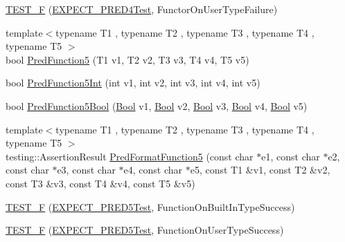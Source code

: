 \begin{DoxyCompactItemize}
\item 
\mbox{\hyperlink{_obj__test_2lib_2googletest-release-1_88_81_2googletest_2test_2gtest__pred__impl__unittest_8cc_a1a34c19097ac1b8c806460f6bbaad59a}{T\+E\+S\+T\+\_\+F}} (\mbox{\hyperlink{googletest-master_2googletest_2test_2gtest__pred__impl__unittest_8cc_abbf7ac63ea663c0dec815df5770cd2a8}{E\+X\+P\+E\+C\+T\+\_\+\+P\+R\+E\+D4\+Test}}, Functor\+On\+User\+Type\+Failure)
\item 
{\footnotesize template$<$typename T1 , typename T2 , typename T3 , typename T4 , typename T5 $>$ }\\bool \mbox{\hyperlink{_obj__test_2lib_2googletest-release-1_88_81_2googletest_2test_2gtest__pred__impl__unittest_8cc_aacb9302c548682f154ddf1a02a23a99f}{Pred\+Function5}} (T1 v1, T2 v2, T3 v3, T4 v4, T5 v5)
\item 
bool \mbox{\hyperlink{_obj__test_2lib_2googletest-release-1_88_81_2googletest_2test_2gtest__pred__impl__unittest_8cc_ac2bb9ad4db9fc578bd739bbba5aa374f}{Pred\+Function5\+Int}} (int v1, int v2, int v3, int v4, int v5)
\item 
bool \mbox{\hyperlink{_obj__test_2lib_2googletest-release-1_88_81_2googletest_2test_2gtest__pred__impl__unittest_8cc_a6e081dd19571256aef33154ce936563f}{Pred\+Function5\+Bool}} (\mbox{\hyperlink{struct_bool}{Bool}} v1, \mbox{\hyperlink{struct_bool}{Bool}} v2, \mbox{\hyperlink{struct_bool}{Bool}} v3, \mbox{\hyperlink{struct_bool}{Bool}} v4, \mbox{\hyperlink{struct_bool}{Bool}} v5)
\item 
{\footnotesize template$<$typename T1 , typename T2 , typename T3 , typename T4 , typename T5 $>$ }\\testing\+::\+Assertion\+Result \mbox{\hyperlink{_obj__test_2lib_2googletest-release-1_88_81_2googletest_2test_2gtest__pred__impl__unittest_8cc_a09cbd3b6651151c3b97a890d28bdb75f}{Pred\+Format\+Function5}} (const char $\ast$e1, const char $\ast$e2, const char $\ast$e3, const char $\ast$e4, const char $\ast$e5, const T1 \&v1, const T2 \&v2, const T3 \&v3, const T4 \&v4, const T5 \&v5)
\item 
\mbox{\hyperlink{_obj__test_2lib_2googletest-release-1_88_81_2googletest_2test_2gtest__pred__impl__unittest_8cc_a1b36f70a595ae4a209741df2a62002c3}{T\+E\+S\+T\+\_\+F}} (\mbox{\hyperlink{googletest-master_2googletest_2test_2gtest__pred__impl__unittest_8cc_a9e7ab56ee0997fdc5c9f7318d0f1094c}{E\+X\+P\+E\+C\+T\+\_\+\+P\+R\+E\+D5\+Test}}, Function\+On\+Built\+In\+Type\+Success)
\item 
\mbox{\hyperlink{_obj__test_2lib_2googletest-release-1_88_81_2googletest_2test_2gtest__pred__impl__unittest_8cc_a2d0901e19bffadc3482d9116cd590eb0}{T\+E\+S\+T\+\_\+F}} (\mbox{\hyperlink{googletest-master_2googletest_2test_2gtest__pred__impl__unittest_8cc_a9e7ab56ee0997fdc5c9f7318d0f1094c}{E\+X\+P\+E\+C\+T\+\_\+\+P\+R\+E\+D5\+Test}}, Function\+On\+User\+Type\+Success)

\end{DoxyCompactItemize}
